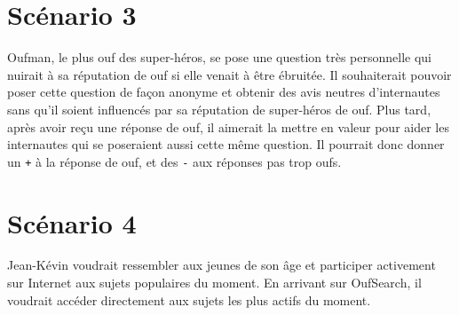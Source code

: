\documentclass[a4paper,11pt]{report}
\begin{document}
\section*{Scénario 3}
Oufman, le plus ouf des super-héros, se pose une question très personnelle qui nuirait à sa réputation de ouf si elle venait à être ébruitée. Il souhaiterait pouvoir poser cette question de façon anonyme et obtenir des avis neutres d'internautes sans qu'il soient influencés par sa réputation de super-héros de ouf. Plus tard, après avoir reçu une réponse de ouf, il aimerait la mettre en valeur pour aider les internautes qui se poseraient aussi cette même question. Il pourrait donc donner un \texttt{+} à la réponse de ouf, et des \texttt{-} aux réponses pas trop oufs.

\section*{Scénario 4}
Jean-Kévin voudrait ressembler aux jeunes de son âge et participer activement sur Internet aux sujets populaires du moment. En arrivant sur OufSearch, il voudrait accéder directement aux sujets les plus actifs du moment.
\end{document}
